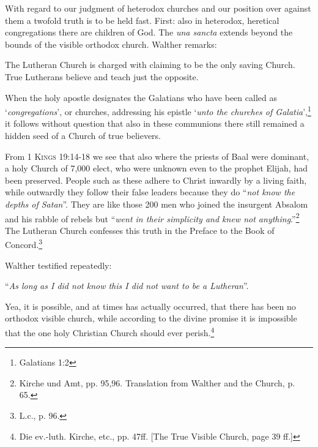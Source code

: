                 With regard to our judgment of heterodox churches and our position over against them a twofold truth is to be held fast.  First: also in heterodox, heretical congregations there are children of God.  The \textit{una sancta} extends beyond the bounds of the visible orthodox church.  Walther remarks: \begin{fancyquotes} The Lutheran Church is charged with claiming to be the only saving Church.  True Lutherans believe and teach just the opposite. \par When the holy apostle designates the Galatians who have been called as ‘\textit{congregations}’, or churches, addressing his epistle ‘\textit{unto the churches of Galatia}’,\footnote{Galatians 1:2} it follows without question that also in these communions there still remained a hidden seed of a Church of true believers.\end{fancyquotes}  From {\scriptsize\textsc{1 Kings 19:14-18}} we see that also where the priests of Baal were dominant, a holy Church of 7,000 elect, who were unknown even to the prophet Elijah, had been preserved.  People such as these adhere to Christ inwardly by a living faith, while outwardly they follow their false leaders because they do “\textit{not know the depths of Satan}”.  They are like those 200 men who joined the insurgent Absalom and his rabble of rebels but “\textit{went in their simplicity and knew not anything}.”\footnote{Kirche und Amt, pp. 95,96.  Translation from Walther and the Church, p. 65.}  The Lutheran Church confesses this truth in the Preface to the Book of Concord.\footnote{L.c., p. 96.} \par Walther testified repeatedly: \begin{displayquote}“\textit{As long as I did not know this I did not want to be a Lutheran}”.\end{displayquote}  Yea, it is possible, and at times has actually occurred, that there has been no orthodox visible church, while according to the divine promise it is impossible that the one holy Christian Church should ever perish.\footnote{Die ev.-luth. Kirche, etc., pp. 47ff. [The True Visible Church, page 39 ff.]}

